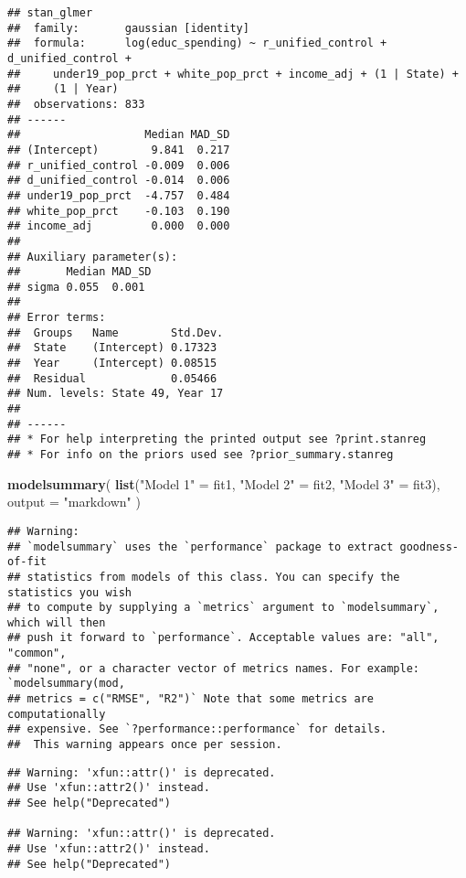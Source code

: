 \documentclass[
]{article}
\newenvironment{Shaded}{\begin{snugshade}}{\end{snugshade}}
\newcommand{\AttributeTok}[1]{\textcolor[rgb]{0.13,0.29,0.53}{#1}}
\newcommand{\FunctionTok}[1]{\textcolor[rgb]{0.13,0.29,0.53}{\textbf{#1}}}
\newcommand{\NormalTok}[1]{#1}
\newcommand{\OtherTok}[1]{\textcolor[rgb]{0.56,0.35,0.01}{#1}}
\newcommand{\StringTok}[1]{\textcolor[rgb]{0.31,0.60,0.02}{#1}}
\begin{document}
\begin{verbatim}
## stan_glmer
##  family:       gaussian [identity]
##  formula:      log(educ_spending) ~ r_unified_control + d_unified_control + 
##     under19_pop_prct + white_pop_prct + income_adj + (1 | State) + 
##     (1 | Year)
##  observations: 833
## ------
##                   Median MAD_SD
## (Intercept)        9.841  0.217
## r_unified_control -0.009  0.006
## d_unified_control -0.014  0.006
## under19_pop_prct  -4.757  0.484
## white_pop_prct    -0.103  0.190
## income_adj         0.000  0.000
## 
## Auxiliary parameter(s):
##       Median MAD_SD
## sigma 0.055  0.001 
## 
## Error terms:
##  Groups   Name        Std.Dev.
##  State    (Intercept) 0.17323 
##  Year     (Intercept) 0.08515 
##  Residual             0.05466 
## Num. levels: State 49, Year 17 
## 
## ------
## * For help interpreting the printed output see ?print.stanreg
## * For info on the priors used see ?prior_summary.stanreg
\end{verbatim}

\begin{Shaded}
\begin{Highlighting}[]
\FunctionTok{modelsummary}\NormalTok{(}
  \FunctionTok{list}\NormalTok{(}\StringTok{"Model 1"} \OtherTok{=}\NormalTok{ fit1, }\StringTok{"Model 2"} \OtherTok{=}\NormalTok{ fit2, }\StringTok{"Model 3"} \OtherTok{=}\NormalTok{ fit3),}
  \AttributeTok{output =} \StringTok{"markdown"}   
\NormalTok{)}
\end{Highlighting}
\end{Shaded}

\begin{verbatim}
## Warning: 
## `modelsummary` uses the `performance` package to extract goodness-of-fit
## statistics from models of this class. You can specify the statistics you wish
## to compute by supplying a `metrics` argument to `modelsummary`, which will then
## push it forward to `performance`. Acceptable values are: "all", "common",
## "none", or a character vector of metrics names. For example: `modelsummary(mod,
## metrics = c("RMSE", "R2")` Note that some metrics are computationally
## expensive. See `?performance::performance` for details.
##  This warning appears once per session.
\end{verbatim}

\begin{verbatim}
## Warning: 'xfun::attr()' is deprecated.
## Use 'xfun::attr2()' instead.
## See help("Deprecated")

## Warning: 'xfun::attr()' is deprecated.
## Use 'xfun::attr2()' instead.
## See help("Deprecated")
\end{verbatim}
\end{document}
